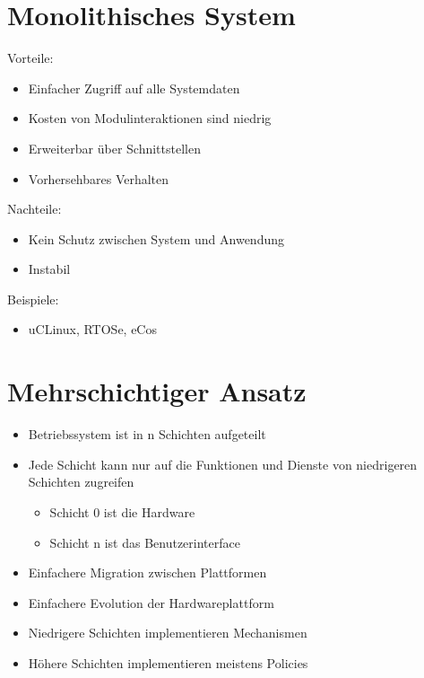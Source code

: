 \documentclass[a4paper]{scrreprt}
\begin{document}
\section{Monolithisches System}
Vorteile:
	\begin{itemize} 
		\item Einfacher Zugriff auf alle Systemdaten 
		\item Kosten von Modulinteraktionen sind niedrig
		\item Erweiterbar über Schnittstellen
		\item Vorhersehbares Verhalten 
	\end{itemize}
Nachteile:
	\begin{itemize}
		\item Kein Schutz zwischen System und Anwendung
		\item Instabil
	\end{itemize}

Beispiele:
	\begin{itemize}
		\item uCLinux, RTOSe, eCos
	\end{itemize}
	
\section{Mehrschichtiger Ansatz}
	\begin{itemize}
		\item Betriebssystem ist in n Schichten aufgeteilt
		\item Jede Schicht kann nur auf die Funktionen und Dienste von niedrigeren Schichten zugreifen 
			\begin{itemize} 
				\item Schicht 0 ist die Hardware
				\item Schicht n ist das Benutzerinterface
			\end{itemize}
		\item Einfachere Migration zwischen Plattformen
		\item Einfachere Evolution der Hardwareplattform
		\item Niedrigere Schichten implementieren Mechanismen
		\item Höhere Schichten implementieren meistens Policies
	\end{itemize}
\end{document}

